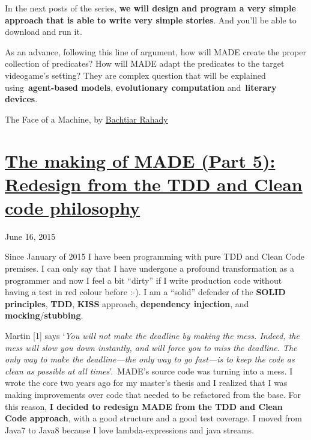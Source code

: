 \documentclass[a4paper]{article}
\newcommand\textstyleStrongEmphasis[1]{\textbf{#1}}
\begin{document}
In the next posts of the series, \textstyleStrongEmphasis{we will design
and program a very simple approach that is able to write very simple
stories}. And you{\textquoteright}ll be able to download and run it.

As an advance, following this line of argument, how will MADE create the
proper collection of predicates? How will MADE adapt the predicates to
the target videogame{\textquoteright}s setting? They are complex
question that will be explained
using~\textstyleStrongEmphasis{agent-based models},
\textstyleStrongEmphasis{evolutionary computation}
and~\textstyleStrongEmphasis{literary devices}.


The Face of a Machine, by
\href{https://www.flickr.com/photos/rahady/}{Bachtiar Rahady}
\clearpage\section[The making of MADE (Part 5): Redesign from the TDD
and Clean code
philosophy]{\href{http://www.velonuboso.com/made/2015/06/16/making-part-5-redesign-tdd-clean-code-philosophy/}{The
making of MADE (Part 5): Redesign from the TDD and Clean code
philosophy}}
June 16, 2015

Since January of 2015 I have been programming with pure TDD and Clean
Code premises. I can only say that I have undergone a profound
transformation as a programmer and now I feel a bit
{\textquotedblleft}dirty{\textquotedblright} if I write production code
without having a test in red colour before :-). I am a
{\textquotedblleft}solid{\textquotedblright} defender of the
\textstyleStrongEmphasis{SOLID principles},
\textstyleStrongEmphasis{TDD}, \textstyleStrongEmphasis{KISS} approach,
\textstyleStrongEmphasis{dependency injection}, and
\textstyleStrongEmphasis{mocking}/\textstyleStrongEmphasis{stubbing}.

Martin [1] says {\textquoteleft}\textit{You will not make the deadline
by making the mess. Indeed, the mess will slow you down instantly, and
will force you to miss the deadline. The only way to make the
deadline---the only way to go fast---is to keep the code as clean as
possible at all times}{\textquoteright}.~MADE{\textquoteright}s source
code was turning into a mess. I wrote the core two years ago for my
master{\textquoteright}s thesis and I realized that I was making
improvements over code that needed to be refactored from the base. For
this reason, \textstyleStrongEmphasis{I decided to redesign MADE from
the TDD and Clean Code approach}, with a good structure and a good test
coverage. I moved from Java7 to Java8 because I love lambda-expressions
and java streams.
\end{document}
